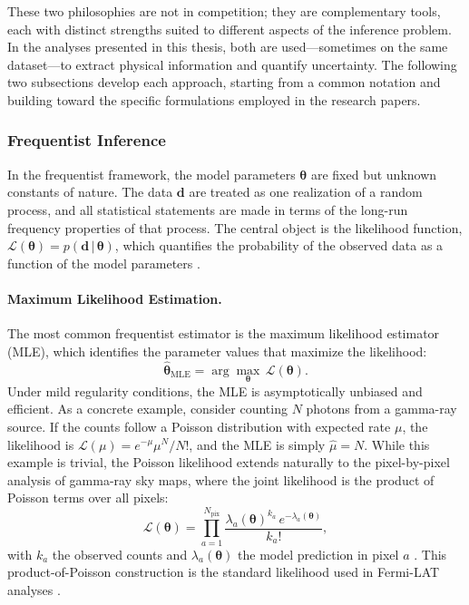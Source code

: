 These two philosophies are not in competition; they are complementary tools, each with distinct strengths suited to different aspects of the inference problem. In the analyses presented in this thesis, both are used---sometimes on the same dataset---to extract physical information and quantify uncertainty. The following two subsections develop each approach, starting from a common notation and building toward the specific formulations employed in the research papers.


\subsubsection{Frequentist Inference}
\label{sec:3.1.2}

In the frequentist framework, the model parameters $\boldsymbol{\theta}$ are fixed but unknown constants of nature. The data $\mathbf{d}$ are treated as one realization of a random process, and all statistical statements are made in terms of the long-run frequency properties of that process. The central object is the likelihood function, $\mathcal{L}(\boldsymbol{\theta}) = p(\mathbf{d} \,|\, \boldsymbol{\theta})$, which quantifies the probability of the observed data as a function of the model parameters \cite{Hastie:2009}.

\paragraph{Maximum Likelihood Estimation.}

The most common frequentist estimator is the maximum likelihood estimator (MLE), which identifies the parameter values that maximize the likelihood:
\begin{equation}
\hat{\boldsymbol{\theta}}_{\mathrm{MLE}} = \arg\max_{\boldsymbol{\theta}} \, \mathcal{L}(\boldsymbol{\theta}).
\label{eq:mle}
\end{equation}
Under mild regularity conditions, the MLE is asymptotically unbiased and efficient. As a concrete example, consider counting $N$ photons from a gamma-ray source. If the counts follow a Poisson distribution with expected rate $\mu$, the likelihood is $\mathcal{L}(\mu) = e^{-\mu} \mu^N / N!$, and the MLE is simply $\hat{\mu} = N$. While this example is trivial, the Poisson likelihood extends naturally to the pixel-by-pixel analysis of gamma-ray sky maps, where the joint likelihood is the product of Poisson terms over all pixels:
\begin{equation}
\mathcal{L}(\boldsymbol{\theta}) = \prod_{a=1}^{N_{\mathrm{pix}}} \frac{\lambda_a(\boldsymbol{\theta})^{k_a} \, e^{-\lambda_a(\boldsymbol{\theta})}}{k_a!},
\label{eq:poisson_likelihood}
\end{equation}
with $k_a$ the observed counts and $\lambda_a(\boldsymbol{\theta})$ the model prediction in pixel $a$ \cite{Amerio:2023dns}. This product-of-Poisson construction is the standard likelihood used in Fermi-LAT analyses \cite{Mattox:1996}.


